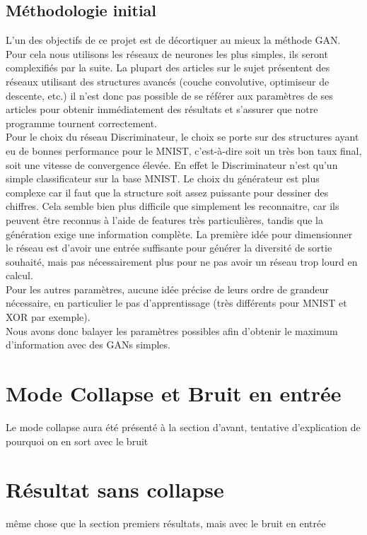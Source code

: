 	\subsection{Méthodologie initial}
		L'un des objectifs de ce projet est de décortiquer au mieux la méthode GAN. Pour cela nous utilisons les réseaux de neurones les plus simples, ils seront complexifiés par la suite. La plupart des articles sur le sujet présentent des réseaux utilisant des structures avancés (couche convolutive, optimiseur de descente, etc.) il n'est donc pas possible de se référer aux paramètres de ses articles pour obtenir immédiatement des résultats et s'assurer que notre programme tournent correctement. \\
		Pour le choix du réseau Discriminateur, le choix se porte sur des structures ayant eu de bonnes performance pour le MNIST, c'est-à-dire soit un très bon taux final, soit une vitesse de convergence élevée. En effet le Discriminateur n'est qu'un simple classificateur sur la base MNIST. Le choix du générateur est plus complexe car il faut que la structure soit assez puissante pour dessiner des chiffres. Cela semble bien plus difficile que simplement les reconnaitre, car ils peuvent être reconnus à l'aide de features très particulières, tandis que la génération exige une information complète. La première idée pour dimensionner le réseau est d'avoir une entrée suffisante pour générer la diversité de sortie souhaité, mais pas nécessairement plus pour ne pas avoir un réseau trop lourd en calcul.\\
		Pour les autres paramètres, aucune idée précise de leurs ordre de grandeur nécessaire, en particulier le pas d'apprentissage (très différents pour MNIST et XOR par exemple).\\
		Nous avons donc balayer les paramètres possibles afin d'obtenir le maximum d'information avec des GANs simples.




\section{Mode Collapse et Bruit en entrée}

{Le mode collapse aura été présenté à la section d'avant, tentative d'explication de pourquoi on en sort avec le bruit}

\section{Résultat sans collapse}
{même chose que la section premiers résultats, mais avec le bruit en entrée}

